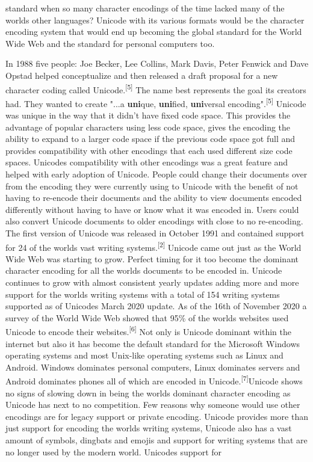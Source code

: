 \documentclass{article}
\begin{document}
\begin{multicols*}{2}
\begin{flushleft}
standard when so many character encodings of the time lacked many of the worlds other languages? Unicode with its various formats would be the character encoding system that would end up becoming the global standard for the World Wide Web and the standard for personal computers too.\end{flushleft} 

\begin{flushleft}
In 1988 five people: Joe Becker, Lee Collins, Mark Davis, Peter Fenwick and Dave Opstad helped 
conceptualize and then released a draft proposal for a new character coding called Unicode.\textsuperscript{[5]} The name best represents the goal its creators had. They wanted to create "...a \textbf{uni}que, \textbf{uni}fied, \textbf{uni}versal encoding".\textsuperscript{[5]} Unicode was unique in the way that it didn't have fixed code space. This provides the advantage of popular characters using less code space, gives the encoding the ability to expand to a larger code space if the previous code space got full and provides compatibility with other encodings that each used different size code spaces. Unicodes compatibility with other encodings was a great feature and helped with early adoption of Unicode. People could change their documents over from the encoding they were currently using to Unicode with the benefit of not having to re-encode their documents and the ability to view documents encoded differently without having to have or know what it was encoded in. Users could also convert Unicode documents to older encodings with close to no re-encoding. \linebreak\linebreak The first version of Unicode was released in October 1991 and contained support for 24 of the worlds vast writing systems.\textsuperscript{[2]} Unicode came out just as the World Wide Web was starting to grow. Perfect timing for it too become the dominant character encoding for all the worlds documents to be encoded in. Unicode continues to grow with almost consistent yearly updates adding more and more support for the worlds writing systems with a total of 154 writing systems supported as of Unicodes March 2020 update. As of the 16th of November 2020 a survey of the World Wide Web showed that 95\% of the worlds websites used Unicode to encode their websites.\textsuperscript{[6]} Not only is Unicode dominant within the internet but also it has become the default standard for the Microsoft Windows operating systems and most Unix-like operating systems such as Linux and Android. Windows dominates personal computers, Linux dominates servers and Android dominates phones all of which are encoded in Unicode.\textsuperscript{[7]}\linebreak Unicode shows no signs of slowing down in being the worlds dominant character encoding as Unicode has next to no competition. Few reasons why someone would use other encodings are for legacy support or private encoding. Unicode provides more than just support for encoding the worlds writing systems, Unicode also has a vast amount of symbols, dingbats and emojis and support for writing systems that are no longer used by the modern world. Unicodes support for 
\end{flushleft}
\end{multicols*}
\end{document}
